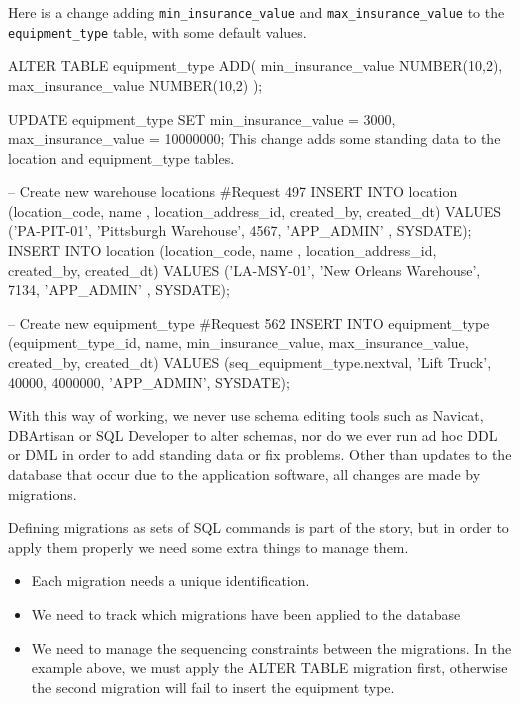 \documentclass[12pt]{article}
\begin{document}
Here is a change adding \verb=min_insurance_value= and
\verb=max_insurance_value= to the \verb=equipment_type= table, with some
default values.

\begin{sqlcode}
ALTER TABLE equipment_type ADD(
  min_insurance_value NUMBER(10,2),
  max_insurance_value NUMBER(10,2)
);

UPDATE equipment_type SET
          min_insurance_value  =  3000,
          max_insurance_value = 10000000;
This change adds some standing data to the location and equipment_type tables.

-- Create new warehouse locations #Request 497
INSERT INTO location (location_code, name , location_address_id,
  created_by, created_dt)
VALUES ('PA-PIT-01', 'Pittsburgh Warehouse', 4567,
  'APP_ADMIN' , SYSDATE);
INSERT INTO location (location_code, name , location_address_id,
  created_by, created_dt)
VALUES ('LA-MSY-01', 'New Orleans Warehouse', 7134,
  'APP_ADMIN' , SYSDATE);

-- Create new equipment_type #Request 562
INSERT INTO equipment_type (equipment_type_id, name,
  min_insurance_value, max_insurance_value, created_by, created_dt)
VALUES (seq_equipment_type.nextval, 'Lift Truck',
  40000, 4000000, 'APP_ADMIN', SYSDATE);
\end{sqlcode}

With this way of working, we never use schema editing tools such as
Navicat, DBArtisan or SQL Developer to alter schemas, nor do we ever run
ad hoc DDL or DML in order to add standing data or fix problems. Other
than updates to the database that occur due to the application software,
all changes are made by migrations.

Defining migrations as sets of SQL commands is part of the story, but in
order to apply them properly we need some extra things to manage them.

\begin{itemize}
  \item Each migration needs a unique identification.
  \item We need to track which migrations have been applied to the
    database
  \item We need to manage the sequencing constraints between the
    migrations. In the example above, we must apply the ALTER TABLE
    migration first, otherwise the second migration will fail to insert
    the equipment type.
\end{itemize}
\end{document}
